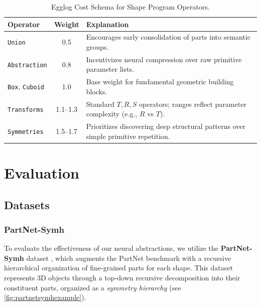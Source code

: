 \documentclass{thesis}
\begin{document}
\begin{table}[htbp]
\centering
\caption{Egglog Cost Schema for Shape Program Operators.}
\label{tab:egg_costs}
\renewcommand{\arraystretch}{1.2}
\begin{tabular}{@{}lc p{}@{}}
\toprule
\textbf{Operator} & \textbf{Weight} & \textbf{Explanation} \\ \midrule
\texttt{Union} & 0.5 & Encourages early consolidation of parts into semantic groups. \\
\texttt{Abstraction} & 0.8 & Incentivizes neural compression over raw primitive parameter lists. \\
\texttt{Box}, \texttt{Cuboid} & 1.0 & Base weight for fundamental geometric building blocks. \\
\texttt{Transforms} & 1.1--1.3 & Standard $T, R, S$ operators; ranges reflect parameter complexity (e.g., $R$ vs $T$). \\
\texttt{Symmetries} & 1.5--1.7 & Prioritizes discovering deep structural patterns over simple primitive repetition. \\
\bottomrule
\end{tabular}
\end{table}




\chapter{Evaluation}\label{ch:evaluation}

\section{Datasets}

\subsection{PartNet-Symh}\label{eval_dataset}
To evaluate the effectiveness of our neural abstractions, we utilize the \textbf{PartNet-Symh} dataset \cite{Yu_2019_CVPR, Mo_2019_CVPR}, which augments the PartNet benchmark with a recursive hierarchical organization of fine-grained parts for each shape. This dataset represents 3D objects through a top-down recursive decomposition into their constituent parts, organized as a \textit{symmetry hierarchy} (see \autoref{fig:partnetsymhexample}).
\end{document}
